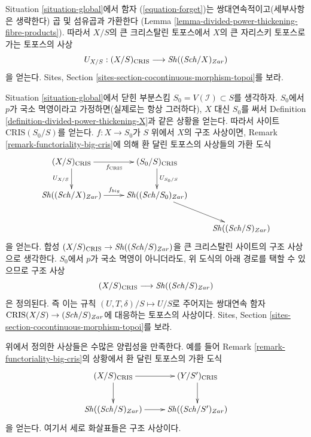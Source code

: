 \begin{remark}
\label{remark-compare-big-zariski}
Situation \ref{situation-global}에서 함자 (\ref{equation-forget})는
쌍대연속적이고(세부사항은 생략한다) 곱 및 섬유곱과 가환한다
(Lemma \ref{lemma-divided-power-thickening-fibre-products}).
따라서 $X/S$의 큰 크리스탈린 토포스에서 $X$의 큰 자리스키
토포스로 가는 토포스의 사상
$$
U_{X/S} : (X/S)_{\text{CRIS}} \longrightarrow \mathop{\mathit{Sh}}\nolimits((\mathit{Sch}/X)_{Zar})
$$
을 얻는다. Sites, Section \ref{sites-section-cocontinuous-morphism-topoi}를
보라.
\end{remark}

\begin{remark}[구조 사상]
\label{remark-big-structure-morphism}
Situation \ref{situation-global}에서 닫힌 부분스킴
$S_0 = V(\mathcal{I}) \subset S$를 생각하자. $S_0$에서 $p$가
국소 멱영이라고 가정하면(실제로는 항상 그러하다), $X$ 대신
$S_0$를 써서 Definition \ref{definition-divided-power-thickening-X}과
같은 상황을 얻는다. 따라서 사이트 $\text{CRIS}(S_0/S)$를 얻는다.
$f : X \to S_0$가 $S$ 위에서 $X$의 구조 사상이면,
Remark \ref{remark-functoriality-big-cris}에 의해 환 달린 토포스의
사상들의 가환 도식
$$
\xymatrix{
(X/S)_{\text{CRIS}}
\ar[r]_{f_{\text{CRIS}}} \ar[d]_{U_{X/S}} &
(S_0/S)_{\text{CRIS}} \ar[d]^{U_{S_0/S}} \\
\Sh((\Sch/X)_{Zar}) \ar[r]^{f_{big}} & \Sh((\Sch/S_0)_{Zar}) \ar[rd] \\
& & \Sh((\Sch/S)_{Zar})
}
$$
을 얻는다. 합성 $(X/S)_{\text{CRIS}} \to \mathop{\mathit{Sh}}\nolimits((\mathit{Sch}/S)_{Zar})$을
큰 크리스탈린 사이트의 구조 사상으로 생각한다. $S_0$에서 $p$가
국소 멱영이 아니더라도, 위 도식의 아래 경로를 택할 수 있으므로
구조 사상
$$
(X/S)_{\text{CRIS}} \longrightarrow \mathop{\mathit{Sh}}\nolimits((\mathit{Sch}/S)_{Zar})
$$
은 정의된다. 즉 이는 규칙 $(U, T, \delta)/S \mapsto U/S$로 주어지는
쌍대연속 함자 $\text{CRIS}(X/S) \to (\mathit{Sch}/S)_{Zar}$에 대응하는
토포스의 사상이다. Sites,
Section \ref{sites-section-cocontinuous-morphism-topoi}를 보라.
\end{remark}

\begin{remark}[양립성]
\label{remark-compatibilities-big-cris}
위에서 정의한 사상들은 수많은 양립성을 만족한다. 예를 들어
Remark \ref{remark-functoriality-big-cris}의 상황에서 환 달린
토포스의 가환 도식
$$
\xymatrix{
(X/S)_{\text{CRIS}} \ar[d] \ar[r] & (Y/S')_{\text{CRIS}} \ar[d] \\
\Sh((\Sch/S)_{Zar}) \ar[r] & \Sh((\Sch/S')_{Zar})
}
$$
을 얻는다. 여기서 세로 화살표들은 구조 사상이다.
\end{remark}



